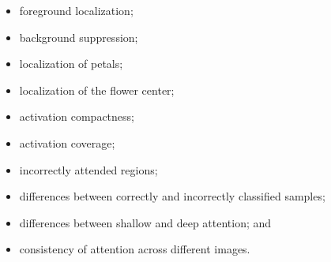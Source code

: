 \documentclass[10pt]{article}
\begin{document}
\begin{itemize}

\item foreground localization;

\item background suppression;

\item localization of petals;

\item localization of the flower center;

\item activation compactness;

\item activation coverage;

\item incorrectly attended regions;

\item differences between correctly and incorrectly classified samples;

\item differences between shallow and deep attention; and

\item consistency of attention across different images.

\end{itemize}
\end{document}
